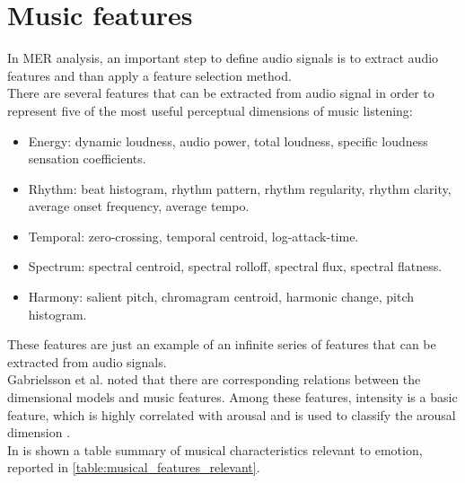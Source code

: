 \section{Music features}\label{music_features}
In MER analysis, an important step to define audio signals is to extract audio features and than apply a feature selection method.
\\
There are several features that can be extracted from audio signal in order to represent five of the most useful perceptual dimensions of music listening:
\begin{itemize}
	\item Energy: dynamic loudness, audio power, total loudness, specific loudness sensation coefficients.
	\item Rhythm: beat histogram, rhythm pattern, rhythm regularity, rhythm clarity, average onset frequency, average tempo.
	\item Temporal: zero-crossing, temporal centroid, log-attack-time.
	\item Spectrum: spectral centroid, spectral rolloff, spectral flux, spectral flatness.
	\item Harmony: salient pitch, chromagram centroid, harmonic change, pitch histogram.
\end{itemize}
These features are just an example of an infinite series of features that can be extracted from audio signals.
\\ \indent
Gabrielsson et al. \cite{gabrielsson2001influence} noted that there are corresponding relations between the dimensional models and music features. Among these features, intensity is a basic feature, which is highly correlated with arousal and is used to classify the arousal dimension \cite{zhang2017feature}.
\\
In \cite{panda2018novel} is shown a table summary of musical characteristics relevant to emotion, reported in \ref{table:musical_features_relevant}.
